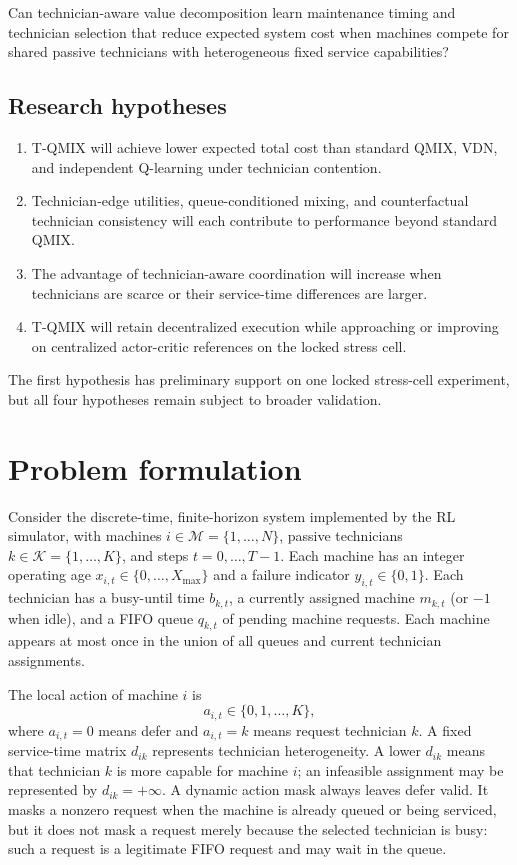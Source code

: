 \documentclass[11pt]{article}
\begin{document}
Can technician-aware value decomposition learn maintenance timing and technician selection that reduce expected system cost when machines compete for shared passive technicians with heterogeneous fixed service capabilities?

\subsection{Research hypotheses}

\begin{enumerate}[leftmargin=*]
    \item T-QMIX will achieve lower expected total cost than standard QMIX, VDN, and independent Q-learning under technician contention.
    \item Technician-edge utilities, queue-conditioned mixing, and counterfactual technician consistency will each contribute to performance beyond standard QMIX.
    \item The advantage of technician-aware coordination will increase when technicians are scarce or their service-time differences are larger.
    \item T-QMIX will retain decentralized execution while approaching or improving on centralized actor-critic references on the locked stress cell.
\end{enumerate}

The first hypothesis has preliminary support on one locked stress-cell experiment, but all four hypotheses remain subject to broader validation.

\section{Problem formulation}

Consider the discrete-time, finite-horizon system implemented by the RL simulator, with machines $i\in\mathcal{M}=\{1,\ldots,N\}$, passive technicians $k\in\mathcal{K}=\{1,\ldots,K\}$, and steps $t=0,\ldots,T-1$. Each machine has an integer operating age $x_{i,t}\in\{0,\ldots,X_{\max}\}$ and a failure indicator $y_{i,t}\in\{0,1\}$. Each technician has a busy-until time $b_{k,t}$, a currently assigned machine $m_{k,t}$ (or $-1$ when idle), and a FIFO queue $q_{k,t}$ of pending machine requests. Each machine appears at most once in the union of all queues and current technician assignments.

The local action of machine $i$ is
\begin{equation}
    a_{i,t}\in\{0,1,\ldots,K\},
\end{equation}
where $a_{i,t}=0$ means defer and $a_{i,t}=k$ means request technician $k$. A fixed service-time matrix $d_{ik}$ represents technician heterogeneity. A lower $d_{ik}$ means that technician $k$ is more capable for machine $i$; an infeasible assignment may be represented by $d_{ik}=+\infty$. A dynamic action mask always leaves defer valid. It masks a nonzero request when the machine is already queued or being serviced, but it does not mask a request merely because the selected technician is busy: such a request is a legitimate FIFO request and may wait in the queue.
\end{document}

